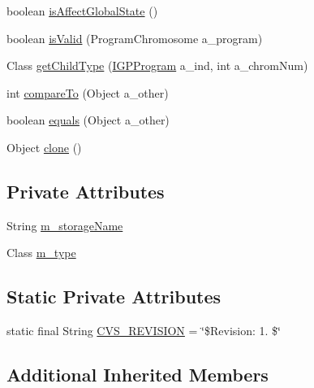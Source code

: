 \begin{DoxyCompactItemize}
\item 
boolean \hyperlink{classorg_1_1jgap_1_1gp_1_1function_1_1_store_terminal_a788efe7f3f4697802f35052f95cd6af1}{is\-Affect\-Global\-State} ()
\item 
boolean \hyperlink{classorg_1_1jgap_1_1gp_1_1function_1_1_store_terminal_a06ccf1ed4d37495d9a8c4e4ca449e167}{is\-Valid} (Program\-Chromosome a\-\_\-program)
\item 
Class \hyperlink{classorg_1_1jgap_1_1gp_1_1function_1_1_store_terminal_a549fc63d1109bd698e81433786717de4}{get\-Child\-Type} (\hyperlink{interfaceorg_1_1jgap_1_1gp_1_1_i_g_p_program}{I\-G\-P\-Program} a\-\_\-ind, int a\-\_\-chrom\-Num)
\item 
int \hyperlink{classorg_1_1jgap_1_1gp_1_1function_1_1_store_terminal_a7b2ae95c6ae74bb874992339f01843b9}{compare\-To} (Object a\-\_\-other)
\item 
boolean \hyperlink{classorg_1_1jgap_1_1gp_1_1function_1_1_store_terminal_a0d215c5a96016c1ae703e69924c53ac9}{equals} (Object a\-\_\-other)
\item 
Object \hyperlink{classorg_1_1jgap_1_1gp_1_1function_1_1_store_terminal_a9aedbd448b3600fcb16949c95e351dd7}{clone} ()
\end{DoxyCompactItemize}
\subsection*{Private Attributes}
\begin{DoxyCompactItemize}
\item 
String \hyperlink{classorg_1_1jgap_1_1gp_1_1function_1_1_store_terminal_ab899823ec1e32ebe43d6a8ba92799ca9}{m\-\_\-storage\-Name}
\item 
Class \hyperlink{classorg_1_1jgap_1_1gp_1_1function_1_1_store_terminal_a0abbccf6fa579fc39df324bd1746d5d2}{m\-\_\-type}
\end{DoxyCompactItemize}
\subsection*{Static Private Attributes}
\begin{DoxyCompactItemize}
\item 
static final String \hyperlink{classorg_1_1jgap_1_1gp_1_1function_1_1_store_terminal_a10572bd373748d70d4379d84baaa1274}{C\-V\-S\-\_\-\-R\-E\-V\-I\-S\-I\-O\-N} = \char`\"{}\$Revision\-: 1. \$\char`\"{}
\end{DoxyCompactItemize}
\subsection*{Additional Inherited Members}


